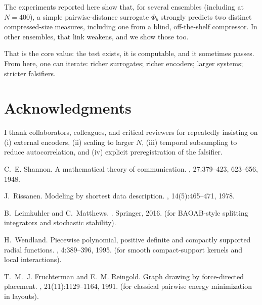 \documentclass[11pt,a4paper]{article}
\numberwithin{equation}{section}
\newcommand{\phib}{\Phi_b}
\begin{document}
The experiments reported here show that, for several ensembles (including at $N{=}400$), a simple pairwise-distance surrogate $\phib$ strongly predicts two distinct compressed-size measures, including one from a blind, off-the-shelf compressor. In other ensembles, that link weakens, and we show those too.

That is the core value: the test exists, it is computable, and it sometimes passes. From here, one can iterate: richer surrogates; richer encoders; larger systems; stricter falsifiers.

\section*{Acknowledgments}
I thank collaborators, colleagues, and critical reviewers for repeatedly insisting on (i) external encoders, (ii) scaling to larger $N$, (iii) temporal subsampling to reduce autocorrelation, and (iv) explicit preregistration of the falsifier.


\begin{thebibliography}{10}

C.~E. Shannon.
\newblock A mathematical theory of communication.
, 27:379--423, 623--656, 1948.

J.~Rissanen.
\newblock Modeling by shortest data description.
, 14(5):465--471, 1978.

B.~Leimkuhler and C.~Matthews.
.
\newblock Springer, 2016.
\newblock (for BAOAB-style splitting integrators and stochastic stability).

H.~Wendland.
\newblock Piecewise polynomial, positive definite and compactly supported
  radial functions.
, 4:389--396, 1995.
\newblock (for smooth compact-support kernels and local interactions).

T.~M.~J. Fruchterman and E.~M. Reingold.
\newblock Graph drawing by force-directed placement.
, 21(11):1129--1164, 1991.
\newblock (for classical pairwise energy minimization in layouts).

\end{thebibliography}
\end{document}
